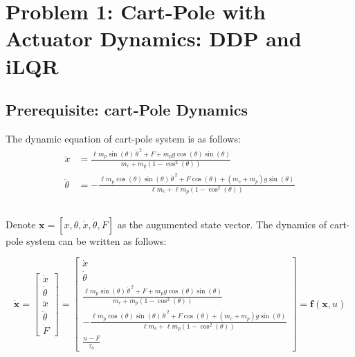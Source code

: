 \renewcommand{\thesubsection}{(\alph{subsection})}

\section{Problem 1: Cart-Pole with Actuator Dynamics: DDP and iLQR}
\subsection*{Prerequisite: cart-Pole Dynamics}
The dynamic equation of cart-pole system is as follows:
\begin{align}
\ddot{x} &= \frac{\ell m_p \sin(\theta)\,\dot{\theta}^{\,2} + F + m_p g \cos(\theta)\sin(\theta)}
{
    m_c + m_p\left(1-\cos^2(\theta)\right)
}\\
\ddot{\theta} &= -\frac{
    \ell m_p \cos(\theta)\sin(\theta)\,\dot{\theta}^{\,2}
    + F\cos(\theta)
    + (m_c + m_p)g\sin(\theta)
}{
    \ell m_c + \ell m_p\left(1-\cos^2(\theta)\right)
}
\end{align}

\subsection{ }
Denote $\mathbf{x} = [x, \theta, \dot{x}, \dot{\theta}, F]$ as the augumented state vector. The dynamics of cart-pole system can be written as follows:

\begin{equation}
    \dot{\mathbf{x}} = 
\begin{bmatrix}
    \dot{x}\\
    \dot{\theta}\\
    \ddot{x}\\
    \ddot{\theta}\\
    \dot{F}
\end{bmatrix}
= 
\begin{bmatrix}
    \dot{x}\\
    \dot{\theta}\\
    \frac{\ell m_p \sin(\theta)\,\dot{\theta}^{\,2} + F + m_p g \cos(\theta)\sin(\theta)}
{
    m_c + m_p\left(1-\cos^2(\theta)\right)
}\\
    -\frac{
    \ell m_p \cos(\theta)\sin(\theta)\,\dot{\theta}^{\,2}
    + F\cos(\theta)
    + (m_c + m_p)g\sin(\theta)
}{
    \ell m_c + \ell m_p\left(1-\cos^2(\theta)\right)
}\\
    \frac{u-F}{\tau_a}
\end{bmatrix}
= \boldsymbol{f}(\mathbf{x},u)
\label{eq: dynamics equation}
\end{equation}

